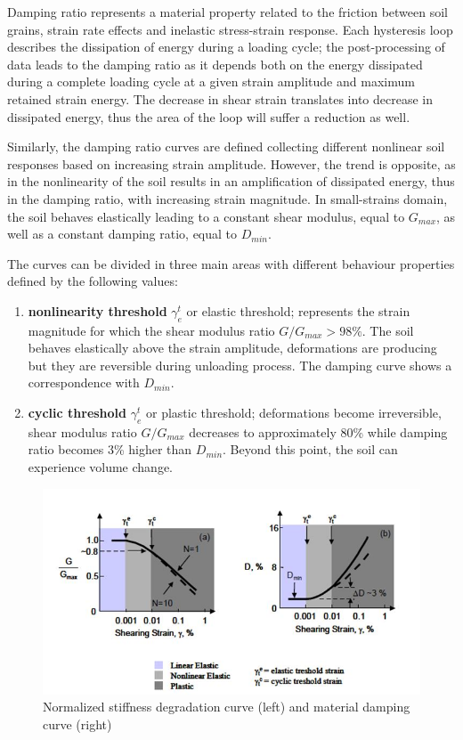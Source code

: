 \documentclass[10pt,a4paper]{report}
\begin{document}
Damping ratio represents a material property related to the friction between soil grains, strain rate effects and inelastic stress-strain response. Each hysteresis loop describes the dissipation of energy during a loading cycle; the post-processing of data leads to the damping ratio as it depends both on the energy dissipated during a complete loading cycle at a given strain amplitude and maximum retained strain energy. The decrease in shear strain translates into decrease in dissipated energy, thus the area of the loop will suffer a reduction as well. 

Similarly, the damping ratio curves are defined collecting different nonlinear soil responses based on increasing strain amplitude. However, the trend is opposite, as in the nonlinearity of the soil results in an amplification of dissipated energy, thus in the damping ratio,  with increasing strain magnitude. 
In small-strains domain, the soil behaves elastically leading to a constant shear modulus, equal to $G_{max}$, as well as a constant damping ratio, equal to $D_{min}$.

The curves can be divided in three main areas with different behaviour properties defined by the following values:
\begin{enumerate}
	\item \textbf{nonlinearity threshold} $\gamma_e^t$ or elastic threshold; represents the strain magnitude for which the shear modulus ratio $G/G_{max}>98\%$. The soil behaves elastically above the strain amplitude, deformations are producing but they are reversible during unloading process. The damping curve shows a correspondence with $D_{min}$. 
	\item \textbf{cyclic threshold} $\gamma_e^t$ or plastic threshold; deformations become irreversible, shear modulus ratio $G/G_{max}$ decreases to approximately 80\% while damping ratio becomes 3\% higher than $D_{min}$. Beyond this point, the soil can experience volume change. 
\end{enumerate}

\begin{figure}[h!]
	\centering
	\includegraphics[width=0.8\linewidth]{"normalized"}
	\caption{Normalized stiffness degradation curve (left) and material damping curve (right)}
	\label{normalized}
\end{figure}
\end{document}
